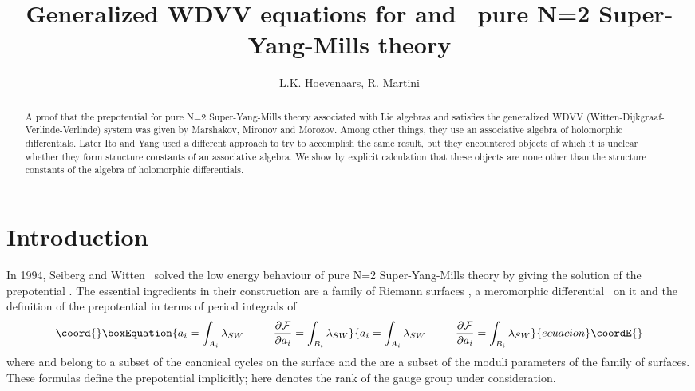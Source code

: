 \documentclass[a4paper,11pt]{article}
\numberwithin{equation}{section}
\begin{document}
\title{\textbf{Generalized WDVV equations for }\coordHE{} \textbf{and }\coordHE{}\textbf{%
\ pure N=2 Super-Yang-Mills theory}}
\date{}
\author{L.K. Hoevenaars, R. Martini}
\maketitle

\begin{abstract}
\noindent
A proof that the prepotential for pure N=2 Super-Yang-Mills theory
associated with Lie algebras \coordHE{} and \coordHE{} satisfies the generalized
WDVV (Witten-Dijkgraaf-Verlinde-Verlinde) system was given by
Marshakov, Mironov and Morozov. Among other things, they use an
associative algebra of holomorphic differentials.
Later Ito and Yang used a different approach to try to accomplish the
same result, but they encountered objects of which it is unclear whether they
form structure constants of an associative algebra.
We show by explicit calculation that these objects are none other
than the structure constants of the algebra of holomorphic differentials.
\end{abstract}


\section{Introduction}

In 1994, Seiberg and Witten \cite{SEIB-WITT1:1994}\ solved the low energy
behaviour of pure N=2 Super-Yang-Mills theory by giving the solution of the
prepotential \coordHE{}. The essential ingredients in their construction
are a family of Riemann surfaces \myHighlight{$\Sigma$}\coordHE{}, a meromorphic differential
\coordHE{}\ on it and the definition of the prepotential in terms of
period integrals of \coordHE{}%
\begin{equation}\coord{}\boxEquation{
a_{i}=\int_{A_{i}}\lambda_{SW}\text{ \ \ \ \ \ \ \ }\frac{\partial\mathcal{F}
}{\partial a_{i}}=\int_{B_{i}}\lambda_{SW}
}{
a_{i}=\int_{A_{i}}\lambda_{SW}\text{ \ \ \ \ \ \ \ }\frac{\partial\mathcal{F}
}{\partial a_{i}}=\int_{B_{i}}\lambda_{SW}
}{ecuacion}\coordE{}\end{equation}
where \coordHE{} and \coordHE{} belong to a subset of the canonical cycles on the
surface \myHighlight{$\Sigma$}\coordHE{} and the \coordHE{} are a subset of the moduli parameters of the
family of surfaces. These formulas define the prepotential \coordHE{} implicitly; here \coordHE{} denotes the rank of the gauge
group under consideration.
\end{document}
